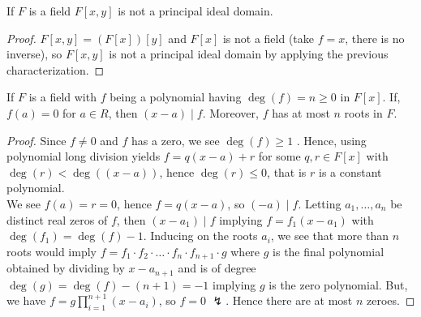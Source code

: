 \begin{corollary}
	If \(F\) is a field \(F\left[ x, y \right] \) is not a principal ideal domain.
\end{corollary}
\begin{proof}
	\(F\left[ x, y \right] = \left( F\left[ x \right]  \right) \left[ y \right]  \) and \(F\left[ x \right] \) is not a field (take \(f = x\), there is no inverse), so \(F\left[ x, y \right] \) is not a principal ideal domain by applying the previous characterization.
\end{proof}
\begin{theorem}
	If \(F\) is a field with \(f\) being a polynomial having \(\deg \left( f \right) = n \ge 0\) in \(F\left[ x \right] \). If, \(f\left( a \right) = 0\) for \(a \in R\), then \(\left( x-a \right) \mid f\). Moreover, \(f\) has at most \(n\) roots in \(F\).
\end{theorem}
\begin{proof}
	Since \(f \neq 0\) and \(f\) has a zero, we see \(\deg \left( f \right) \ge 1\) . Hence, using polynomial long division yields \(f = q\left( x-a \right) + r\) for some \(q, r \in F\left[ x \right] \) with \(\deg \left( r \right) < \deg \left( \left( x-a \right)  \right) \), hence \(\deg \left( r \right) \le 0\), that is \(r\) is a constant polynomial.\\
	We see \(f\left( a \right) = r = 0\), hence \(f = q\left( x-a \right)  \), so \(\left( -a \right) \mid f\). Letting \(a_1, \ldots, a_{n}\) be distinct real zeros of \(f\), then \(\left( x-a_1 \right) \mid f\) implying \(f = f_1\left( x - a_1 \right) \) with \(\deg \left( f_1 \right) = \deg \left( f \right) - 1\). Inducing on the roots \(a_{i}\), we see that more than \(n\) roots would imply \(f = f_1 \cdot f_2 \cdot \ldots \cdot f_{n} \cdot f_{n + 1} \cdot g\) where \(g\) is the final polynomial obtained by dividing by \(x - a_{n+1}\)  and is of degree \(\deg \left( g \right)  = \deg \left( f \right)  - (n+1) = -1\) implying \(g\) is the zero polynomial. But, we have \(f = g\prod_{i= 1}^{n+1} \left( x- a_{i} \right)  \), so \(f = 0\) \(\lightning\). Hence there are at most \(n\) zeroes.
\end{proof}

